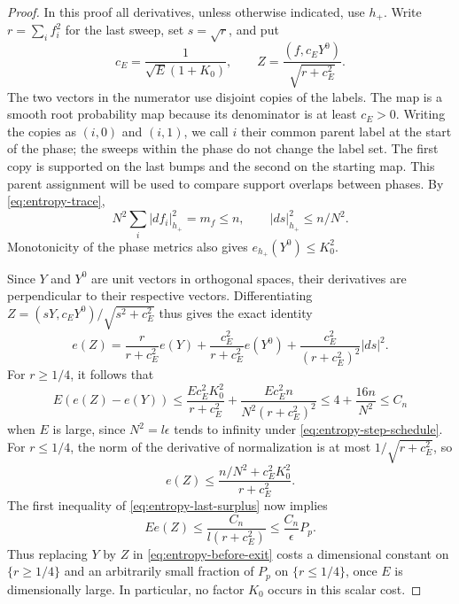 \begin{proof}
In this proof all derivatives, unless otherwise indicated, use \(h_+\).
Write \(r=\sum_i f_i^2\) for the last sweep, set \(s=\sqrt r\), and put
\[
 c_E=\frac1{\sqrt E(1+K_0)},\qquad
 Z=\frac{(f,c_EY^0)}{\sqrt{r+c_E^2}}.
\]
The two vectors in the numerator use disjoint copies of the labels.
The map is a smooth root probability map because its denominator is
at least \(c_E>0\).  Writing the copies as \((i,0)\) and \((i,1)\),
we call \(i\) their common parent label at the start of the phase;
the sweeps within the phase do not change the label set.  The first
copy is supported on the last bumps and the second on the starting
map.  This parent assignment will be used to compare support overlaps
between phases.  By \eqref{eq:entropy-trace},
\[
 N^2\sum_i|df_i|_{h_+}^2=m_f\leq n,\qquad
 |ds|_{h_+}^2\leq n/N^2.
\]
Monotonicity of the phase metrics also gives \(e_{h_+}(Y^0)\leq K_0^2\).

Since \(Y\) and \(Y^0\) are unit vectors in orthogonal spaces, their
derivatives are perpendicular to their respective vectors.  Differentiating
\(Z=(sY,c_EY^0)/\sqrt{s^2+c_E^2}\) thus gives the exact identity
\[
 e(Z)=\frac r{r+c_E^2}e(Y)+\frac{c_E^2}{r+c_E^2}e(Y^0)
           +\frac{c_E^2}{(r+c_E^2)^2}|ds|^2.
\]
For \(r\geq1/4\), it follows that
\[
 E(e(Z)-e(Y))\leq
 \frac{Ec_E^2K_0^2}{r+c_E^2}
       +\frac{Ec_E^2n}{N^2(r+c_E^2)^2}
 \leq 4+\frac{16n}{N^2}\leq C_n
\]
when \(E\) is large, since \(N^2=l\epsilon\) tends to infinity under
\eqref{eq:entropy-step-schedule}.  For \(r\leq1/4\), the norm of the
derivative of normalization is at most \(1/\sqrt{r+c_E^2}\), so
\begin{equation}\label{eq:entropy-Z-energy}
 e(Z)\leq\frac{n/N^2+c_E^2K_0^2}{r+c_E^2}.
\end{equation}
The first inequality of \eqref{eq:entropy-last-surplus} now implies
\[
 E e(Z)\leq \frac{C_n}{l(r+c_E^2)}
       \leq \frac{C_n}{\epsilon}P_p.
\]
Thus replacing \(Y\) by \(Z\) in
\eqref{eq:entropy-before-exit} costs a dimensional constant on
\(\{r\geq1/4\}\) and an arbitrarily small fraction of \(P_p\) on
\(\{r\leq1/4\}\), once \(E\) is dimensionally large.  In particular,
no factor \(K_0\) occurs in this scalar cost.


\end{proof}
